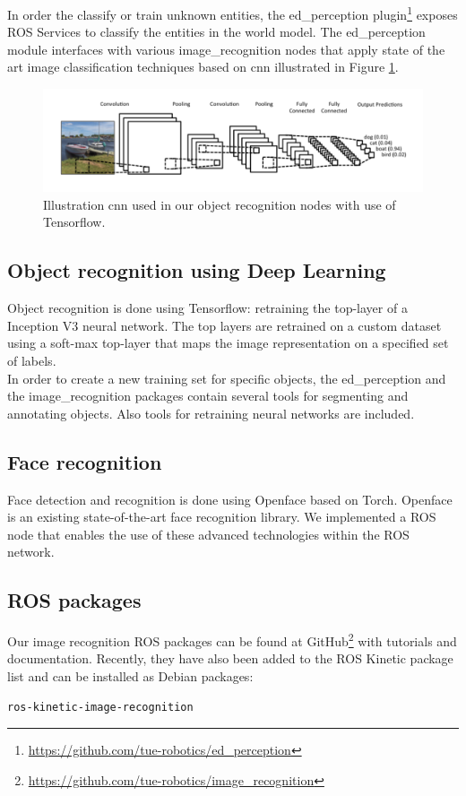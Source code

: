 In order the classify or train unknown entities, the ed\_perception plugin\footnote{\url{https://github.com/tue-robotics/ed_perception}} exposes ROS Services to classify the entities in the world model. The ed\_perception module interfaces with various image\_recognition nodes that apply state of the art image classification techniques based on \acrfull{cnn} illustrated in Figure \ref{fig:cnn}.
\begin{figure}[H]
    \centering
	\includegraphics[width = 1\linewidth]{Figures/cnn}
    \caption{Illustration \acrfull{cnn} used in our object recognition nodes with use of Tensorflow.}
	\label{fig:cnn}
\end{figure}

\subsection{Object recognition using Deep Learning}
Object recognition is done using Tensorflow: retraining the top-layer of a Inception V3 neural network. The top layers are retrained on a custom dataset using a soft-max top-layer that maps the image representation on a specified set of labels.
\\
In order to create a new training set for specific objects, the ed\_perception and the image\_recognition packages contain several tools for segmenting and annotating objects. Also tools for retraining neural networks are included.

\subsection{Face recognition}
Face detection and recognition is done using Openface based on Torch. Openface is an existing state-of-the-art face recognition library. We implemented a ROS node that enables the use of these advanced technologies within the ROS network.
\subsection{ROS packages}
Our image recognition ROS packages can be found at GitHub\footnote{\url{https://github.com/tue-robotics/image_recognition}} with tutorials and documentation. Recently, they have also been added to the ROS Kinetic package list and can be installed as Debian packages:
\begin{lstlisting}
ros-kinetic-image-recognition
\end{lstlisting}